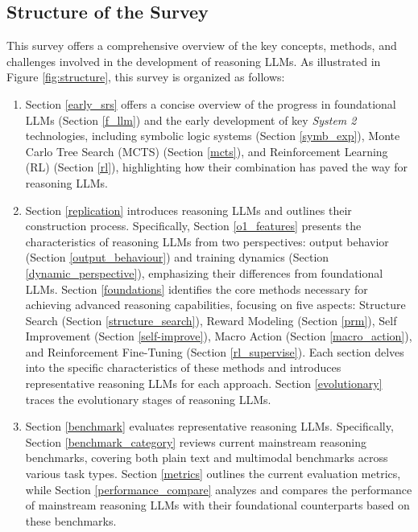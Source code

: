 \begin{figure*}[t]
\centering
\resizebox{0.95\textwidth}{!}{}
\caption{The primary organizational structure of the survey.}
\label{fig:structure}
\end{figure*}


\subsection{Structure of the Survey}


This survey offers a comprehensive overview of the key concepts, methods, and challenges involved in the development of reasoning LLMs. 
As illustrated in Figure \ref{fig:structure}, this survey is organized as follows:
\begin{enumerate}[itemindent=0em]

\item Section \ref{early_srs} offers a concise overview of the progress in foundational LLMs (Section \ref{f_llm}) and the early development of key \textit{System 2} technologies, including symbolic logic systems (Section \ref{symb_exp}), Monte Carlo Tree Search (MCTS) (Section \ref{mcts}), and Reinforcement Learning (RL) (Section \ref{rl}), highlighting how their combination has paved the way for reasoning LLMs. 

\item Section \ref{replication} introduces reasoning LLMs and outlines their construction process. 
Specifically, Section \ref{o1_features} presents the characteristics of reasoning LLMs from two perspectives: output behavior (Section \ref{output_behaviour}) and training dynamics (Section \ref{dynamic_perspective}), emphasizing their differences from foundational LLMs. 
Section \ref{foundations} identifies the core methods necessary for achieving advanced reasoning capabilities, focusing on five aspects: Structure Search (Section \ref{structure_search}), Reward Modeling (Section \ref{prm}), Self Improvement (Section \ref{self-improve}), Macro Action (Section \ref{macro_action}), and Reinforcement Fine-Tuning (Section \ref{rl_supervise}). 
Each section delves into the specific characteristics of these methods and introduces representative reasoning LLMs for each approach. 
Section \ref{evolutionary} traces the evolutionary stages of reasoning LLMs. 

\item Section \ref{benchmark} evaluates representative reasoning LLMs. Specifically, Section \ref{benchmark_category} reviews current mainstream reasoning benchmarks, covering both plain text and multimodal benchmarks across various task types. Section \ref{metrics} outlines the current evaluation metrics, while Section \ref{performance_compare} analyzes and compares the performance of mainstream reasoning LLMs with their foundational counterparts based on these benchmarks.


\end{enumerate}
